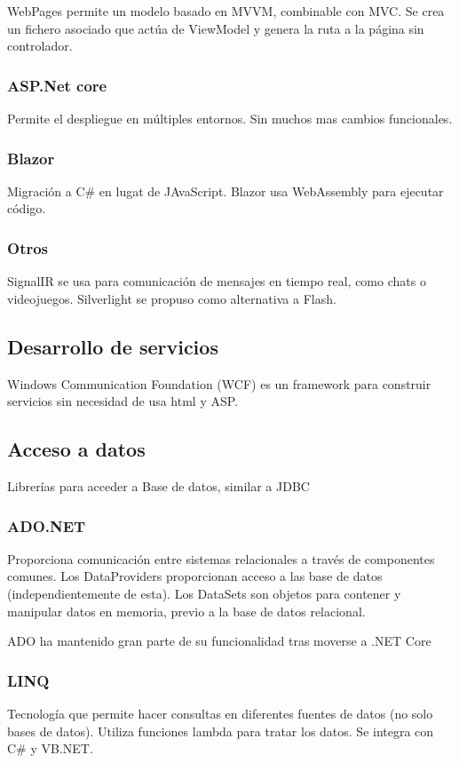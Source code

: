         WebPages permite un modelo basado en MVVM, combinable con MVC. Se crea un fichero asociado que actúa de ViewModel y genera la ruta a la página sin controlador.

    \subsubsection{ASP.Net core}
        Permite el despliegue en múltiples entornos. Sin muchos mas cambios funcionales.

    \subsubsection{Blazor}
        Migración a C\# en lugat de JAvaScript. Blazor usa WebAssembly para ejecutar código.

    \subsubsection{Otros}
        SignalIR se usa para comunicación de mensajes en tiempo real, como chats o videojuegos. Silverlight se propuso como alternativa a Flash.

\subsection{Desarrollo de servicios}
    Windows Communication Foundation (WCF) es un framework para construir servicios sin necesidad de usa html y ASP.

\subsection{Acceso a datos}
    Librerías para acceder a Base de datos, similar a JDBC

    \subsubsection{ADO.NET}
        Proporciona comunicación entre sistemas relacionales a través de componentes comunes. Los DataProviders proporcionan acceso a las base de datos (independientemente de esta). Los DataSets son objetos para contener y manipular datos en memoria, previo a la base de datos relacional.

        ADO ha mantenido gran parte de su funcionalidad tras moverse a .NET Core

    \subsubsection{LINQ}
        Tecnología que permite hacer consultas en diferentes fuentes de datos (no solo bases de datos). Utiliza funciones lambda para tratar los datos. Se integra con C\# y VB.NET.

